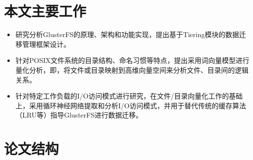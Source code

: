 \section{本文主要工作}
\begin{itemize}
    \item 研究分析GlusterFS的原理、架构和功能实现，提出基于Tiering模块的数据迁移管理框架设计。
    \item 针对POSIX文件系统的目录结构、命名习惯等特点，提出采用词向量模型进行量化分析，即，将文件或目录映射到高维向量空间来分析文件、目录间的逻辑关系。
    \item 针对特定工作负载的I/O访问模式进行研究，在文件/目录向量化工作的基础上，采用循环神经网络提取和分析I/O访问模式，并用于替代传统的缓存算法（LRU等）指导GlusterFS进行数据迁移。
\end{itemize}
\section{论文结构}